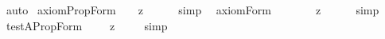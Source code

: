 \begin{isabellebody}
\ auto%
\endisatagproof
{\isafoldproof}%
%
\isadelimproof
%
\endisadelimproof
\isanewline
\isanewline
{}\isamarkupfalse%
\ axiom{\isacharunderscore}{}{\isacharunderscore}PropForm{\isacharcolon}\ {\isachardoublequoteopen}{\isacharbrackleft}{\isasymforall}{\isacharparenleft}{\isasymlambda}{\isasymphi}{\isachardot}\ {\isacharparenleft}{\isasymdiamond}\ {\isacharcomma}{\isasymphi}{\isacharcomma}{\isacharparenright}\ {\isasymrightarrow}\isactrlsup z\ {\isacharparenleft}{\isasymbox}\ {\isacharparenleft}{\isasymdiamond}\ {\isacharcomma}{\isasymphi}{\isacharcomma}{\isacharparenright}{\isacharparenright}{\isacharparenright}{\isacharbrackright}{\isachardoublequoteclose}%
\isadelimproof
\ %
\endisadelimproof
%
\isatagproof
{}\isamarkupfalse%
\ {\isacharparenleft}simp{\isacharparenright}\ \isamarkupfalse%
%
\endisatagproof
{\isafoldproof}%
%
\isadelimproof
%
\endisadelimproof
\isanewline
{}\isamarkupfalse%
\ axiom{\isacharunderscore}{}{\isacharunderscore}Form{\isacharcolon}\ \ \ \ \ {\isachardoublequoteopen}{\isacharbrackleft}{\isasymforall}{\isacharparenleft}{\isasymlambda}{\isasymphi}{\isachardot}\ {\isacharparenleft}{\isasymdiamond}\ {\isacharsemicolon}{\isasymphi}{\isacharsemicolon}{\isacharparenright}\ {\isasymrightarrow}\isactrlsup z\ {\isacharparenleft}{\isasymbox}\ {\isacharparenleft}{\isasymdiamond}\ {\isacharsemicolon}{\isasymphi}{\isacharsemicolon}{\isacharparenright}{\isacharparenright}{\isacharparenright}{\isacharbrackright}{\isachardoublequoteclose}%
\isadelimproof
\ %
\endisadelimproof
%
\isatagproof
{}\isamarkupfalse%
\ {\isacharparenleft}simp{\isacharparenright}\ \isamarkupfalse%
%
\endisatagproof
{\isafoldproof}%
%
\isadelimproof
%
\endisadelimproof
\isanewline
\isanewline
\isanewline
{}\isamarkupfalse%
\ test{\isacharunderscore}A{\isacharunderscore}PropForm{\isacharcolon}\ {\isachardoublequoteopen}{\isacharbrackleft}{\isasymforall}{\isacharparenleft}{\isasymlambda}{\isasymphi}{\isachardot}\ {\isacharparenleft}{\isasymbox}\ {\isacharparenleft}{\isasymdiamond}\ {\isacharcomma}{\isasymphi}{\isacharcomma}{\isacharparenright}{\isacharparenright}\ {\isasymrightarrow}\isactrlsup z\ {\isacharparenleft}{\isasymdiamond}\ {\isacharcomma}{\isasymphi}{\isacharcomma}{\isacharparenright}{\isacharparenright}{\isacharbrackright}{\isachardoublequoteclose}%
\isadelimproof
\ %
\endisadelimproof
%
\isatagproof
{}\isamarkupfalse%
\ {\isacharparenleft}simp{\isacharparenright}\ \isamarkupfalse%
%
\endisatagproof

\end{isabellebody}
